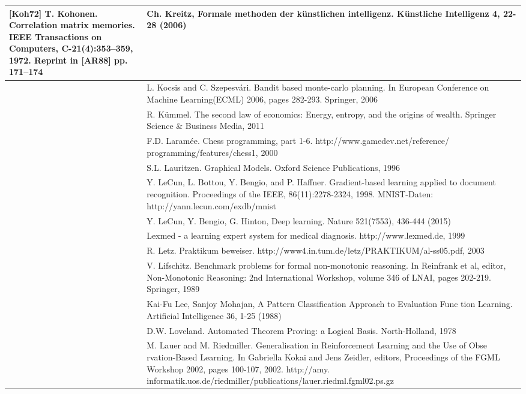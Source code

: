 \documentclass[10pt]{book}
\begin{document}
\begin{tabular}{|l|l|}
[Koh72] T. Kohonen. Correlation matrix memories. IEEE Transactions on Computers, C-21(4):353–359, 1972. Reprint in [AR88] pp. 171–174
 & Ch. Kreitz, Formale methoden der künstlichen intelligenz. Künstliche Intelligenz 4, 22-28 (2006) \\
\hline [KS06] & L. Kocsis and C. Szepesvári. Bandit based monte-carlo planning. In European Conference on Machine Learning(ECML) 2006, pages 282-293. Springer, 2006 \\
\hline [Küm11] & R. Kümmel. The second law of economics: Energy, entropy, and the origins of wealth. Springer Science \& Business Media, 2011 \\
\hline [Lar00] & F.D. Laramée. Chess programming, part 1-6. http://www.gamedev.net/reference/ programming/features/chess1, 2000 \\
\hline [\cite{lauritzen1996graphical}] & S.L. Lauritzen. Graphical Models. Oxford Science Publications, 1996 \\
\hline [LBBH98] & Y. LeCun, L. Bottou, Y. Bengio, and P. Haffner. Gradient-based learning applied to document recognition. Proceedings of the IEEE, 86(11):2278-2324, 1998. MNIST-Daten: http://yann.lecun.com/exdb/mnist \\
\hline [LBH15] & Y. LeCun, Y. Bengio, G. Hinton, Deep learning. Nature 521(7553), 436-444 (2015) \\
\hline [Le999] & Lexmed - a learning expert system for medical diagnosis. http://www.lexmed.de, 1999 \\
\hline [\cite{letz2003praktikum}] & R. Letz. Praktikum beweiser. http://www4.in.tum.de/letz/PRAKTIKUM/al-ss05.pdf, 2003 \\
\hline [\cite{lifschitz1989benchmark}] & V. Lifschitz. Benchmark problems for formal non-monotonic reasoning. In Reinfrank et al, editor, Non-Monotonic Reasoning: 2nd International Workshop, volume 346 of LNAI, pages 202-219. Springer, 1989 \\
\hline [\cite{lee1988evaluation}] & Kai-Fu Lee, Sanjoy Mohajan, A Pattern Classification Approach to Evaluation Func tion Learning. Artificial Intelligence 36, 1-25 (1988) \\
\hline [Lov78] & D.W. Loveland. Automated Theorem Proving: a Logical Basis. North-Holland, 1978 \\
\hline [\cite{lauer2002generalisation}] & M. Lauer and M. Riedmiller. Generalisation in Reinforcement Learning and the Use of Obse rvation-Based Learning. In Gabriella Kokai and Jens Zeidler, editors, Proceedings of the FGML Workshop 2002, pages 100-107, 2002. http://amy. informatik.uos.de/riedmiller/publications/lauer.riedml.fgml02.ps.gz \\

\end{tabular}
\end{document}
